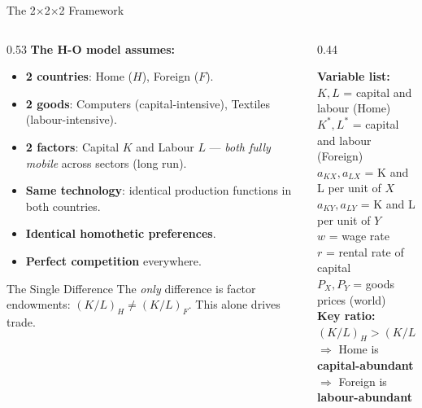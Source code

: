 \documentclass[aspectratio=169]{beamer}
\begin{document}
\begin{frame}[shrink=12]{The 2$\times$2$\times$2 Framework}
\begin{columns}[T]
\begin{column}{0.53\textwidth}
\textbf{The H-O model assumes:}
\begin{itemize}\small
  \item \textbf{2 countries}: Home ($H$), Foreign ($F$).
  \item \textbf{2 goods}: Computers (capital-intensive),
        Textiles (labour-intensive).
  \item \textbf{2 factors}: Capital $K$ and Labour $L$
        --- \emph{both fully mobile} across sectors (long run).
  \item \textbf{Same technology}: identical production
        functions in both countries.
  \item \textbf{Identical homothetic preferences}.
  \item \textbf{Perfect competition} everywhere.
\end{itemize}
\vspace{0.2em}
\begin{insight}{The Single Difference}
\small The \emph{only} difference is factor endowments:
$(K/L)_H \neq (K/L)_F$. This alone drives trade.
\end{insight}
\end{column}
\begin{column}{0.44\textwidth}
\begin{varbox}
\small\textbf{Variable list:}\\[0.2em]
$K, L$ \quad= capital and labour (Home)\\
$K^*, L^*$ = capital and labour (Foreign)\\
$a_{KX}, a_{LX}$ = K and L per unit of $X$\\
$a_{KY}, a_{LY}$ = K and L per unit of $Y$\\
$w$ = wage rate\\
$r$ = rental rate of capital\\
$P_X, P_Y$ = goods prices (world)\\[0.4em]
\textbf{Key ratio:}\\
$(K/L)_H > (K/L)_F$\\
$\Rightarrow$ Home is \textbf{capital-abundant}\\
$\Rightarrow$ Foreign is \textbf{labour-abundant}
\end{varbox}
\end{column}
\end{columns}
\end{frame}
\end{document}
